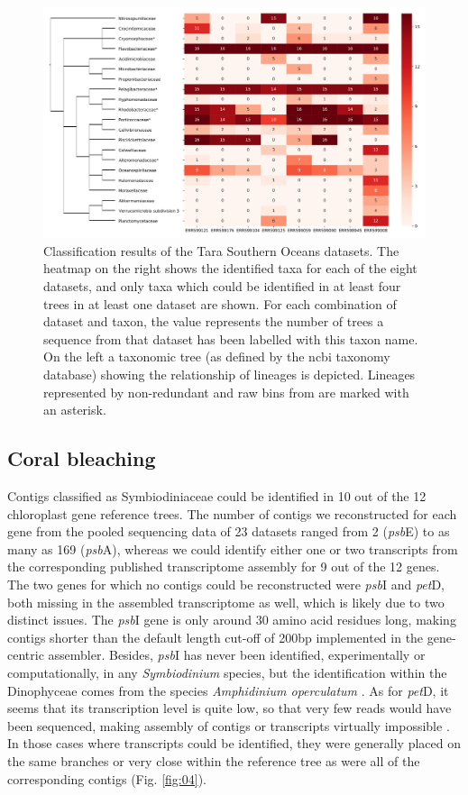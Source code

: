 \documentclass{bioinfo}
\begin{document}
\begin{figure}[!tpb]%
\centerline{\includegraphics[width=.45\textwidth]{figures/Fig3.png}}
\caption{Classification results of the Tara Southern Oceans datasets. The heatmap on the right shows the identified taxa for each of the eight datasets, and only taxa which could be identified in at least four trees in at least one dataset are shown. For each combination of dataset and taxon, the value represents the number of trees a sequence from that dataset has been labelled with this taxon name. On the left a taxonomic tree (as defined by the ncbi taxonomy database) showing the relationship of lineages is depicted. Lineages represented by non-redundant and raw bins from \citet{Delmont2018} are marked with an asterisk.}\label{fig:03}
\end{figure}

\subsection{Coral bleaching}
Contigs classified as Symbiodiniaceae could be identified in 10 out of the 12 chloroplast gene reference trees. The number of contigs we reconstructed for each gene from the pooled sequencing data of 23 datasets ranged from 2 (\textit{psb}E) to as many as 169 (\textit{psb}A), whereas we could identify either one or two transcripts from the corresponding published transcriptome assembly for 9 out of the 12 genes. The two genes for which no contigs could be reconstructed were \textit{psb}I and \textit{pet}D, both missing in the assembled transcriptome as well, which is likely due to two distinct issues. The \textit{psb}I gene is only around 30 amino acid residues long, making contigs shorter than the default length cut-off of 200bp implemented in the gene-centric assembler. Besides, \textit{psb}I has never been identified, experimentally or computationally, in any \textit{Symbiodinium} species, but the identification within the Dinophyceae comes from the species \textit{Amphidinium operculatum} \citep{Nisbet2004,Barbrook2014}. As for \textit{pet}D, it seems that its transcription level is quite low, so that very few reads would have been sequenced, making assembly of contigs or transcripts virtually impossible \citep{Nisbet2008}. In those cases where transcripts could be identified, they were generally placed on the same branches or very close within the reference tree as were all of the corresponding contigs (Fig. \ref{fig:04}).
\end{document}
